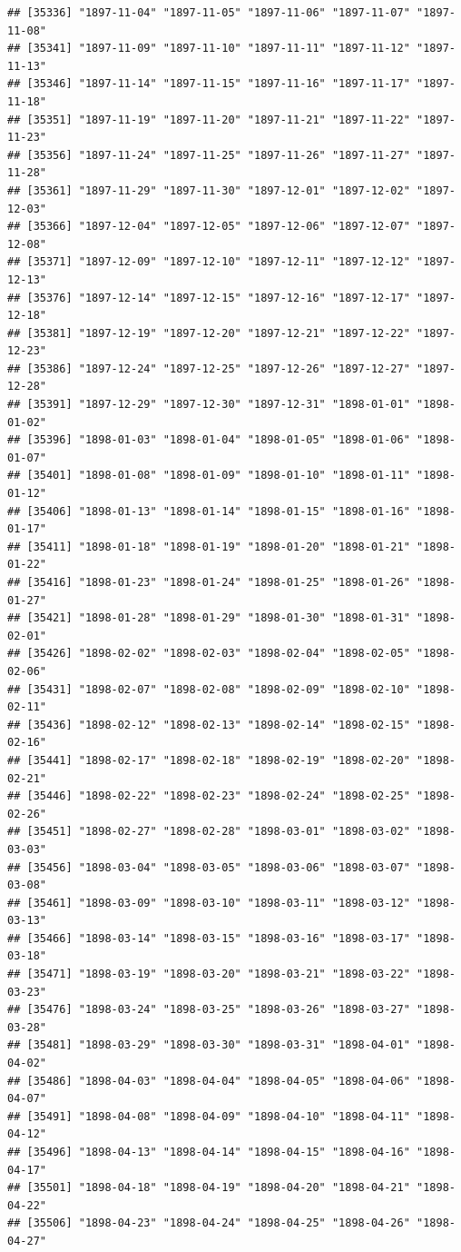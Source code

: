 \documentclass{article}\usepackage[]{graphicx}\usepackage[]{color}
\makeatletter
\newenvironment{kframe}{%
 \def\at@end@of@kframe{}%
 \ifinner\ifhmode%
  \def\at@end@of@kframe{\end{minipage}}%
  \begin{minipage}{\columnwidth}%
 \fi\fi%
 \def\FrameCommand##1{\hskip\@totalleftmargin \hskip-\fboxsep
 \colorbox{shadecolor}{##1}\hskip-\fboxsep
     \hskip-\linewidth \hskip-\@totalleftmargin \hskip\columnwidth}%
 \MakeFramed {\advance\hsize-\width
   \@totalleftmargin\z@ \linewidth\hsize
   \@setminipage}}%
 {\par\unskip\endMakeFramed%
 \at@end@of@kframe}
\newenvironment{knitrout}{}{} %
\makeatother
\begin{document}
\begin{description}
\begin{knitrout}
\begin{kframe}
\begin{verbatim}
## [35336] "1897-11-04" "1897-11-05" "1897-11-06" "1897-11-07" "1897-11-08"
## [35341] "1897-11-09" "1897-11-10" "1897-11-11" "1897-11-12" "1897-11-13"
## [35346] "1897-11-14" "1897-11-15" "1897-11-16" "1897-11-17" "1897-11-18"
## [35351] "1897-11-19" "1897-11-20" "1897-11-21" "1897-11-22" "1897-11-23"
## [35356] "1897-11-24" "1897-11-25" "1897-11-26" "1897-11-27" "1897-11-28"
## [35361] "1897-11-29" "1897-11-30" "1897-12-01" "1897-12-02" "1897-12-03"
## [35366] "1897-12-04" "1897-12-05" "1897-12-06" "1897-12-07" "1897-12-08"
## [35371] "1897-12-09" "1897-12-10" "1897-12-11" "1897-12-12" "1897-12-13"
## [35376] "1897-12-14" "1897-12-15" "1897-12-16" "1897-12-17" "1897-12-18"
## [35381] "1897-12-19" "1897-12-20" "1897-12-21" "1897-12-22" "1897-12-23"
## [35386] "1897-12-24" "1897-12-25" "1897-12-26" "1897-12-27" "1897-12-28"
## [35391] "1897-12-29" "1897-12-30" "1897-12-31" "1898-01-01" "1898-01-02"
## [35396] "1898-01-03" "1898-01-04" "1898-01-05" "1898-01-06" "1898-01-07"
## [35401] "1898-01-08" "1898-01-09" "1898-01-10" "1898-01-11" "1898-01-12"
## [35406] "1898-01-13" "1898-01-14" "1898-01-15" "1898-01-16" "1898-01-17"
## [35411] "1898-01-18" "1898-01-19" "1898-01-20" "1898-01-21" "1898-01-22"
## [35416] "1898-01-23" "1898-01-24" "1898-01-25" "1898-01-26" "1898-01-27"
## [35421] "1898-01-28" "1898-01-29" "1898-01-30" "1898-01-31" "1898-02-01"
## [35426] "1898-02-02" "1898-02-03" "1898-02-04" "1898-02-05" "1898-02-06"
## [35431] "1898-02-07" "1898-02-08" "1898-02-09" "1898-02-10" "1898-02-11"
## [35436] "1898-02-12" "1898-02-13" "1898-02-14" "1898-02-15" "1898-02-16"
## [35441] "1898-02-17" "1898-02-18" "1898-02-19" "1898-02-20" "1898-02-21"
## [35446] "1898-02-22" "1898-02-23" "1898-02-24" "1898-02-25" "1898-02-26"
## [35451] "1898-02-27" "1898-02-28" "1898-03-01" "1898-03-02" "1898-03-03"
## [35456] "1898-03-04" "1898-03-05" "1898-03-06" "1898-03-07" "1898-03-08"
## [35461] "1898-03-09" "1898-03-10" "1898-03-11" "1898-03-12" "1898-03-13"
## [35466] "1898-03-14" "1898-03-15" "1898-03-16" "1898-03-17" "1898-03-18"
## [35471] "1898-03-19" "1898-03-20" "1898-03-21" "1898-03-22" "1898-03-23"
## [35476] "1898-03-24" "1898-03-25" "1898-03-26" "1898-03-27" "1898-03-28"
## [35481] "1898-03-29" "1898-03-30" "1898-03-31" "1898-04-01" "1898-04-02"
## [35486] "1898-04-03" "1898-04-04" "1898-04-05" "1898-04-06" "1898-04-07"
## [35491] "1898-04-08" "1898-04-09" "1898-04-10" "1898-04-11" "1898-04-12"
## [35496] "1898-04-13" "1898-04-14" "1898-04-15" "1898-04-16" "1898-04-17"
## [35501] "1898-04-18" "1898-04-19" "1898-04-20" "1898-04-21" "1898-04-22"
## [35506] "1898-04-23" "1898-04-24" "1898-04-25" "1898-04-26" "1898-04-27"

\end{verbatim}
\end{kframe}
\end{knitrout}
\end{description}
\end{document}
